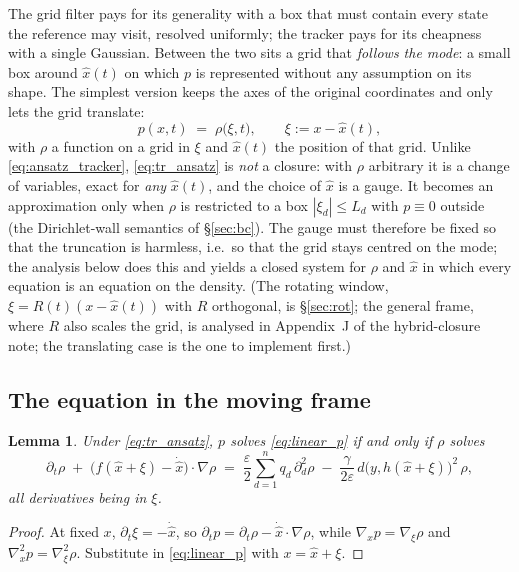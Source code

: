 \documentclass[11pt,a4paper]{article}
\newcommand{\xh}{\hat{x}}
\newcommand{\eps}{\varepsilon}
\newcommand{\abs}[1]{\left\lvert #1 \right\rvert}
\newcommand{\grad}{\nabla}
\theoremstyle{plain}
\newtheorem{lemma}{Lemma}
\theoremstyle{definition}
\theoremstyle{remark}
\begin{document}
The grid filter pays for its generality with a box that must contain every state the reference may visit, resolved uniformly; the tracker pays for its cheapness with a single Gaussian. Between the two sits a grid that \emph{follows the mode}: a small box around $\xh(t)$ on which $p$ is represented without any assumption on its shape. The simplest version keeps the axes of the original coordinates and only lets the grid translate:
\begin{equation}
  p(x,t) \;=\; \rho\big(\xi,t\big), \qquad \xi := x-\xh(t),
  \label{eq:tr_ansatz}
\end{equation}
with $\rho$ a function on a grid in $\xi$ and $\xh(t)$ the position of that grid. Unlike \eqref{eq:ansatz_tracker}, \eqref{eq:tr_ansatz} is \emph{not} a closure: with $\rho$ arbitrary it is a change of variables, exact for \emph{any} $\xh(t)$, and the choice of $\xh$ is a gauge. It becomes an approximation only when $\rho$ is restricted to a box $\abs{\xi_d}\le L_d$ with $p\equiv0$ outside (the Dirichlet-wall semantics of \S\ref{sec:bc}). The gauge must therefore be fixed so that the truncation is harmless, i.e.\ so that the grid stays centred on the mode; the analysis below does this and yields a closed system for $\rho$ and $\xh$ in which every equation is an equation on the density. (The rotating window, $\xi=R(t)(x-\xh(t))$ with $R$ orthogonal, is \S\ref{sec:rot}; the general frame, where $R$ also scales the grid, is analysed in Appendix~J of the hybrid-closure note; the translating case is the one to implement first.)

\subsection{The equation in the moving frame}

\begin{lemma}
Under \eqref{eq:tr_ansatz}, $p$ solves \eqref{eq:linear_p} if and only if $\rho$ solves
\begin{equation}
  \boxed{\;
  \partial_t\rho \;+\; \big(f(\xh+\xi) - \dot{\xh}\big)\cdot\grad\rho
  \;=\; \frac\eps2\sum_{d=1}^nq_d\,\partial_d^2\rho \;-\; \frac{\gamma}{2\eps}\,d\big(y,h(\xh+\xi)\big)^2\,\rho ,\;}
  \label{eq:tr_rho}
\end{equation}
all derivatives being in $\xi$.
\end{lemma}
\begin{proof}
At fixed $x$, $\partial_t\xi = -\dot{\xh}$, so $\partial_tp = \partial_t\rho - \dot{\xh}\cdot\grad\rho$, while $\grad_xp = \grad_\xi\rho$ and $\grad^2_xp = \grad^2_\xi\rho$. Substitute in \eqref{eq:linear_p} with $x = \xh+\xi$.
\end{proof}
\end{document}
